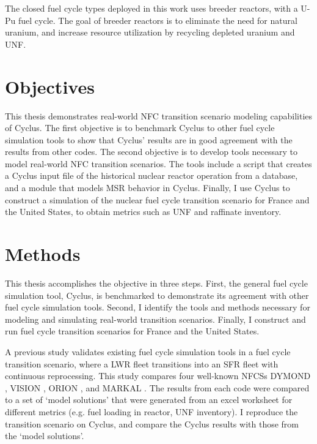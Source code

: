The closed fuel cycle types deployed in this work uses breeder reactors,
with a U-Pu fuel cycle. The goal of breeder
reactors is to eliminate the need for natural uranium, and
increase resource utilization by recycling depleted uranium and \gls{UNF}.


\section{Objectives}

This thesis demonstrates real-world \gls{NFC} transition
scenario modeling capabilities of Cyclus. The first objective is
to benchmark Cyclus to other fuel cycle simulation tools to
show that Cyclus' results are in good agreement with the results
from other codes. The second objective is to develop tools
necessary to model real-world \gls{NFC} transition
scenarios. The tools include a script that creates a Cyclus
input file of the historical nuclear reactor operation from
a database, and a module that models \gls{MSR} behavior in Cyclus.
Finally, I use Cyclus to construct a simulation of the nuclear
fuel cycle transition scenario for France and the United States,
to obtain metrics such as \gls{UNF} and raffinate inventory.


\section{Methods}
This thesis accomplishes the objective in three steps. First,
the general fuel cycle simulation tool, Cyclus, is benchmarked
to demonstrate its agreement with other fuel cycle simulation
tools. Second, I identify the tools and methods necessary
for modeling and simulating real-world transition scenarios.
Finally, I construct and run fuel cycle transition scenarios
for France and the United States.

A previous study \cite{feng_standardized_2016} validates existing fuel cycle
simulation tools in a fuel cycle transition scenario, where a \gls{LWR} fleet
transitions into an \gls{SFR} fleet with continuous reprocessing. This 
study compares four well-known \glspl{NFCS}
DYMOND \cite{yacout_modeling_2005},
VISION \cite{jacobson_verifiable_2010},
ORION \cite{gregg_analysis_2012}, and
MARKAL \cite{shay_epa_2006}. The results from each code were
compared to a set of `model solutions' that were generated
from an excel worksheet for different metrics (e.g. fuel loading
in reactor, \gls{UNF} inventory). I reproduce the transition
scenario on Cyclus, and compare the Cyclus results with those
from the `model solutions'.

